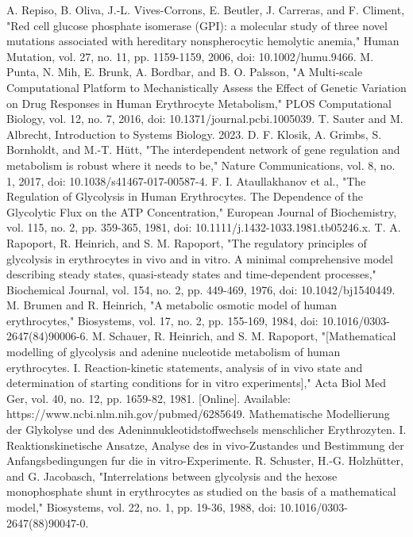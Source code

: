 \documentclass[conference]{IEEEtran}
\begin{document}
\begin{thebibliography}{00}
 A. Repiso, B. Oliva, J.-L. Vives-Corrons, E. Beutler, J. Carreras, and F. Climent, "Red cell glucose phosphate isomerase (GPI): a molecular study of three novel mutations associated with hereditary nonspherocytic hemolytic anemia," Human Mutation, vol. 27, no. 11, pp. 1159-1159, 2006, doi: 10.1002/humu.9466.
 M. Punta, N. Mih, E. Brunk, A. Bordbar, and B. O. Palsson, "A Multi-scale Computational Platform to Mechanistically Assess the Effect of Genetic Variation on Drug Responses in Human Erythrocyte Metabolism," PLOS Computational Biology, vol. 12, no. 7, 2016, doi: 10.1371/journal.pcbi.1005039.
 T. Sauter and M. Albrecht, Introduction to Systems Biology. 2023.
 D. F. Klosik, A. Grimbs, S. Bornholdt, and M.-T. Hütt, "The interdependent network of gene regulation and metabolism is robust where it needs to be," Nature Communications, vol. 8, no. 1, 2017, doi: 10.1038/s41467-017-00587-4.
 F. I. Ataullakhanov et al., "The Regulation of Glycolysis in Human Erythrocytes. The Dependence of the Glycolytic Flux on the ATP Concentration," European Journal of Biochemistry, vol. 115, no. 2, pp. 359-365, 1981, doi: 10.1111/j.1432-1033.1981.tb05246.x.
 T. A. Rapoport, R. Heinrich, and S. M. Rapoport, "The regulatory principles of glycolysis in erythrocytes in vivo and in vitro. A minimal comprehensive model describing steady states, quasi-steady states and time-dependent processes," Biochemical Journal, vol. 154, no. 2, pp. 449-469, 1976, doi: 10.1042/bj1540449.
 M. Brumen and R. Heinrich, "A metabolic osmotic model of human erythrocytes," Biosystems, vol. 17, no. 2, pp. 155-169, 1984, doi: 10.1016/0303-2647(84)90006-6.
 M. Schauer, R. Heinrich, and S. M. Rapoport, "[Mathematical modelling of glycolysis and adenine nucleotide metabolism of human erythrocytes. I. Reaction-kinetic statements, analysis of in vivo state and determination of starting conditions for in vitro experiments]," Acta Biol Med Ger, vol. 40, no. 12, pp. 1659-82, 1981. [Online]. Available: https://www.ncbi.nlm.nih.gov/pubmed/6285649. Mathematische Modellierung der Glykolyse und des Adeninnukleotidstoffwechsels menschlicher Erythrozyten. I. Reaktionskinetische Ansatze, Analyse des in vivo-Zustandes und Bestimmung der Anfangsbedingungen fur die in vitro-Experimente.
 R. Schuster, H.-G. Holzhütter, and G. Jacobasch, "Interrelations between glycolysis and the hexose monophosphate shunt in erythrocytes as studied on the basis of a mathematical model," Biosystems, vol. 22, no. 1, pp. 19-36, 1988, doi: 10.1016/0303-2647(88)90047-0.

\end{thebibliography}
\end{document}
